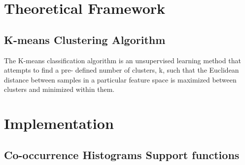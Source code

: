 \appendix

\chapter{Theoretical Framework}

\section{K-means Clustering Algorithm}
The K-means classification algorithm is an unsupervised learning method that
attempts to find a pre- defined number of clusters, k, such that the Euclidean
distance between samples in a particular feature space is maximized between
clusters and minimized within them.


\chapter{Implementation}

\section{Co-occurrence Histograms Support functions}\label{supportCH}

